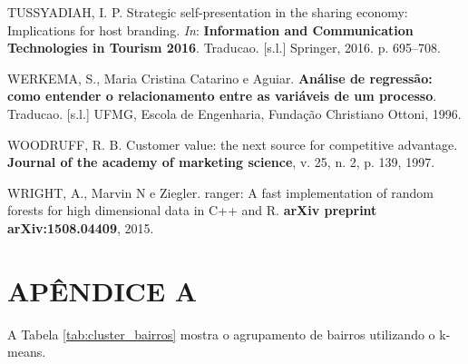 \documentclass[
	12pt,				%
	a4paper,		%
	oneside,    %
	chapter=TITLE,		   %
	section=TITLE,		   %
	subsection=TITLE,	   %
	subsubsection=TITLE, %
	english,			%
	french,				%
	spanish,			%
	brazil,				%
]{abntex2}
\begin{document}
\leavevmode\hypertarget{ref-tussyadiah2016strategic}{}%
TUSSYADIAH, I. P. Strategic self-presentation in the sharing economy:
Implications for host branding. \emph{In}: \textbf{Information and
Communication Technologies in Tourism 2016}. Traducao. {[}s.l.{]}
Springer, 2016. p. 695--708.

\leavevmode\hypertarget{ref-werkema1996analise}{}%
WERKEMA, S., Maria Cristina Catarino e Aguiar. \textbf{Análise de
regressão: como entender o relacionamento entre as variáveis de um
processo}. Traducao. {[}s.l.{]} UFMG, Escola de Engenharia, Fundação
Christiano Ottoni, 1996.

\leavevmode\hypertarget{ref-woodruff1997customer}{}%
WOODRUFF, R. B. Customer value: the next source for competitive
advantage. \textbf{Journal of the academy of marketing science}, v. 25,
n. 2, p. 139, 1997.

\leavevmode\hypertarget{ref-wright2015ranger}{}%
WRIGHT, A., Marvin N e Ziegler. ranger: A fast implementation of random
forests for high dimensional data in C++ and R. \textbf{arXiv preprint
arXiv:1508.04409}, 2015.

\hypertarget{apuxeandice-a}{%
\chapter*{APÊNDICE A}\label{apuxeandice-a}}

A Tabela \ref{tab:cluster_bairros} mostra o agrupamento de bairros
utilizando o k-means.
\end{document}
